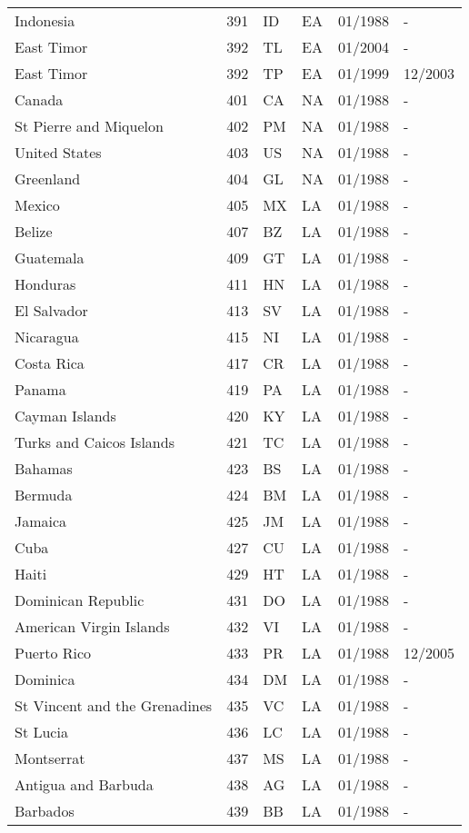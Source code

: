\begin{small}
\begin{longtable}{p{4.3cm}p{1.5cm}p{1.5cm}p{1cm}p{2cm}p{2cm}}
Indonesia	&	391	&	ID	&	EA	&	01/1988	&	-	\\
East Timor	&	392	&	TL	&	EA	&	01/2004	&	-	\\
East Timor	&	392	&	TP	&	EA	&	01/1999	&	12/2003	\\
Canada	&	401	&	CA	&	NA	&	01/1988	&	-	\\
St Pierre and Miquelon	&	402	&	PM	&	NA	&	01/1988	&	-	\\
United States	&	403	&	US	&	NA	&	01/1988	&	-	\\
Greenland	&	404	&	GL	&	NA	&	01/1988	&	-	\\
Mexico	&	405	&	MX	&	LA	&	01/1988	&	-	\\
Belize	&	407	&	BZ	&	LA	&	01/1988	&	-	\\
Guatemala	&	409	&	GT	&	LA	&	01/1988	&	-	\\
Honduras	&	411	&	HN	&	LA	&	01/1988	&	-	\\
El Salvador	&	413	&	SV	&	LA	&	01/1988	&	-	\\
Nicaragua	&	415	&	NI	&	LA	&	01/1988	&	-	\\
Costa Rica	&	417	&	CR	&	LA	&	01/1988	&	-	\\
Panama	&	419	&	PA	&	LA	&	01/1988	&	-	\\
Cayman Islands	&	420	&	KY	&	LA	&	01/1988	&	-	\\
Turks and Caicos Islands	&	421	&	TC	&	LA	&	01/1988	&	-	\\
Bahamas	&	423	&	BS	&	LA	&	01/1988	&	-	\\
Bermuda	&	424	&	BM	&	LA	&	01/1988	&	-	\\
Jamaica	&	425	&	JM	&	LA	&	01/1988	&	-	\\
Cuba	&	427	&	CU	&	LA	&	01/1988	&	-	\\
Haiti	&	429	&	HT	&	LA	&	01/1988	&	-	\\
Dominican Republic	&	431	&	DO	&	LA	&	01/1988	&	-	\\
American Virgin Islands	&	432	&	VI	&	LA	&	01/1988	&	-	\\
Puerto Rico	&	433	&	PR	&	LA	&	01/1988	&	12/2005	\\
Dominica	&	434	&	DM	&	LA	&	01/1988	&	-	\\
St Vincent and the Grenadines	&	435	&	VC	&	LA	&	01/1988	&	-	\\
St Lucia	&	436	&	LC	&	LA	&	01/1988	&	-	\\
Montserrat	&	437	&	MS	&	LA	&	01/1988	&	-	\\
Antigua and Barbuda	&	438	&	AG	&	LA	&	01/1988	&	-	\\
Barbados	&	439	&	BB	&	LA	&	01/1988	&	-	\\

\end{longtable}
\end{small}
